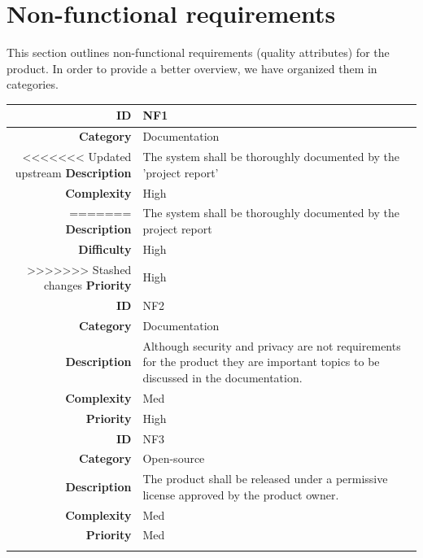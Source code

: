\newpage
\section{Non-functional requirements}
\label{section:nonfunctionalreq}

This section outlines non-functional requirements (quality attributes) for the product.
In order to provide a better overview, we have organized them in categories.


\begin{table}[H]
\begin{center}
\begin{tabular}{ | r | p{11.5cm} | }
  \hline
  
  \textbf{ID} & NF1 \\
  \hline\noalign{\smallskip}\hline
  \textbf{Category}			&	Documentation\\
<<<<<<< Updated upstream
  \textbf{Description}	& The system shall be thoroughly documented by the 'project report' \\
  \textbf{Complexity}		& High \\
=======
  \textbf{Description}	& The system shall be thoroughly documented by the project report \\
  \textbf{Difficulty}		& High \\
>>>>>>> Stashed changes
  \textbf{Priority}			& High \\
  \hline\noalign{\smallskip}\noalign{\smallskip}\hline

  \textbf{ID} & NF2 \\
  \hline\noalign{\smallskip}\hline
  \textbf{Category}			&	Documentation\\
  \textbf{Description}	& Although security and privacy are not requirements for the product they
													are important topics to be discussed in the documentation. \\
  \textbf{Complexity}		& Med \\
  \textbf{Priority}			& High \\
  \hline\noalign{\smallskip}\noalign{\smallskip}\hline

  \textbf{ID} & NF3 \\
  \hline\noalign{\smallskip}\hline
  \textbf{Category}			&	Open-source\\
  \textbf{Description}	& The product shall be released under a permissive license approved by the product owner. \\
  \textbf{Complexity}		& Med \\
  \textbf{Priority}			& Med \\
  \hline\noalign{\smallskip}\noalign{\smallskip}\hline
  

\end{tabular}
\end{center}
\end{table}
